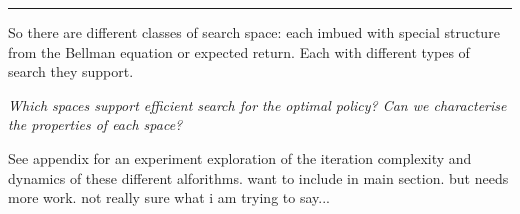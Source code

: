 \begin{center}\rule{0.5\linewidth}{\linethickness}\end{center}

So there are different classes of search space: each imbued with special
structure from the Bellman equation or expected return. Each with different types of search they
support.

\begin{displayquote}
\textit{Which spaces support efficient search for the optimal policy? Can we characterise the properties of each space?}
\end{displayquote}

See appendix for an experiment exploration of the iteration complexity and dynamics of these different alforithms.
{\color{red}want to include in main section. but needs more work. not really sure what i am trying to say...}
